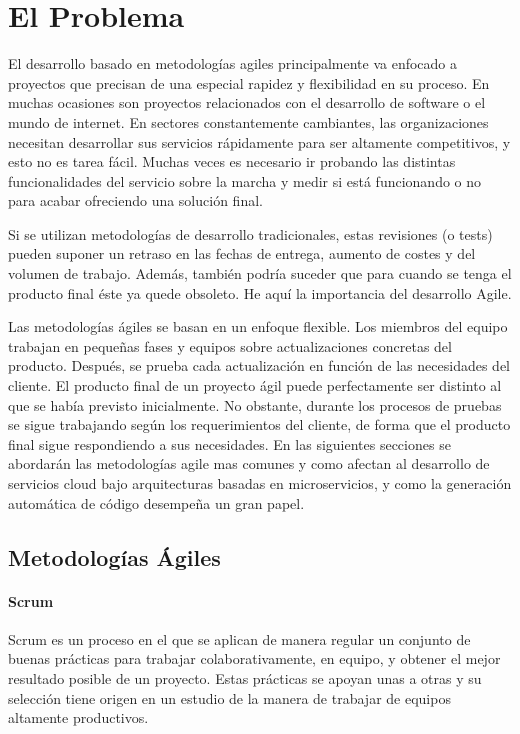\documentclass[a4paper,11pt]{book}
\begin{document}
\chapter{El Problema}

El desarrollo basado en metodologías agiles  principalmente va enfocado a proyectos que precisan de una especial rapidez y flexibilidad en su proceso. En muchas ocasiones son proyectos relacionados con el desarrollo de software o el mundo de internet. En sectores constantemente cambiantes, las organizaciones necesitan desarrollar sus servicios rápidamente para ser altamente competitivos, y esto no es tarea fácil. Muchas veces es necesario ir probando las distintas funcionalidades del servicio sobre la marcha y medir si está funcionando o no para acabar ofreciendo una solución final.

Si se utilizan metodologías  de desarrollo tradicionales, estas revisiones (o tests) pueden suponer un retraso en las fechas de entrega, aumento de costes y del volumen de trabajo. Además, también podría suceder que para cuando se tenga el producto final éste ya quede obsoleto. He aquí la importancia del  desarrollo Agile. 

Las metodologías ágiles se basan en un enfoque flexible. Los miembros del equipo trabajan en pequeñas fases y equipos sobre actualizaciones concretas del producto. Después, se prueba cada actualización en función de las necesidades del cliente. El producto final de un proyecto ágil puede perfectamente ser distinto al que se había previsto inicialmente. No obstante, durante los procesos de pruebas se sigue trabajando según los requerimientos del cliente, de forma que el producto final sigue respondiendo a sus necesidades. En las siguientes secciones se abordarán las metodologías agile mas comunes y como afectan al desarrollo de servicios cloud bajo  arquitecturas basadas en microservicios, y como la generación automática de código desempeña un gran papel. 


\section{Metodologías Ágiles}
\subsubsection{Scrum}

Scrum es un proceso en el que se aplican de manera regular un conjunto de buenas prácticas para trabajar colaborativamente, en equipo, y obtener el mejor resultado posible de un proyecto. Estas prácticas se apoyan unas a otras y su selección tiene origen en un estudio de la manera de trabajar de equipos altamente productivos.
\end{document}
